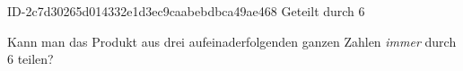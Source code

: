 \begin{exercise}
      {ID-2c7d30265d014332e1d3ec9caabebdbca49ae468}
      {Geteilt durch 6}
  \ifproblem\problem\par
    Kann man das Produkt aus drei aufeinaderfolgenden ganzen Zahlen
    \emph{immer} durch 6 teilen?
  \fi
\end{exercise}
